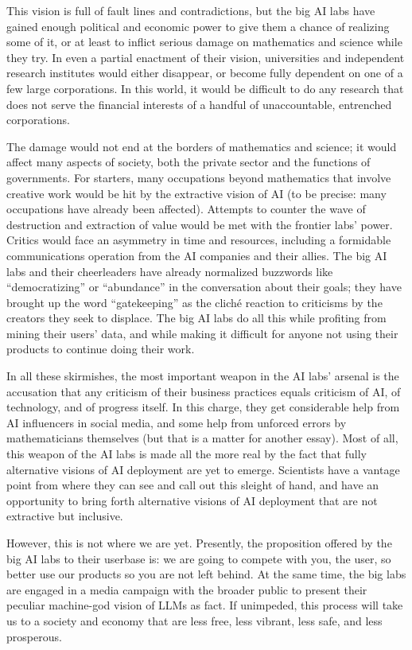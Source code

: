 \documentclass[11pt]{amsart}
\begin{document}
This vision is full of fault lines and contradictions, but the big AI labs have gained enough political and economic power to give them a chance of realizing some of it, or at least to inflict serious damage on mathematics and science while they try. In even a partial enactment of their vision, universities and independent research institutes would either disappear, or become fully dependent on one of a few large corporations. In this world, it would be difficult to do any research that does not serve the financial interests of a handful of unaccountable, entrenched corporations.

The damage would not end at the borders of mathematics and science; it would affect many aspects of society, both the private sector and the functions of governments. For starters, many occupations beyond mathematics that involve creative work would be hit by the extractive vision of AI (to be precise: many occupations have already been affected). Attempts to counter the wave of destruction and extraction of value would be met with the frontier labs' power. Critics would face an asymmetry in time and resources, including a formidable communications operation from the AI companies and their allies. The big AI labs and their cheerleaders have already normalized buzzwords like ``democratizing'' or ``abundance'' in the conversation about their goals; they have brought up the word ``gatekeeping'' as the cliché reaction to criticisms by the creators they seek to displace. The big AI labs do all this while profiting from mining their users' data, and while making it difficult for anyone not using their products to continue doing their work.

In all these skirmishes, the most important weapon in the AI labs' arsenal is the accusation that any criticism of their business practices equals criticism of AI, of technology, and of progress itself. In this charge, they get considerable help from AI influencers in social media, and some help from unforced errors by mathematicians themselves (but that is a matter for another essay). Most of all, this weapon of the AI labs is made all the more real by the fact that fully alternative visions of AI deployment are yet to emerge. Scientists have a vantage point from where they can see and call out this sleight of hand, and have an opportunity to bring forth alternative visions of AI deployment that are not extractive but inclusive.

However, this is not where we are yet. Presently, the proposition offered by the big AI labs to their userbase is: we are going to compete with you, the user, so better use our products so you are not left behind. At the same time, the big labs are engaged in a media campaign with the broader public to present their peculiar machine-god vision of LLMs as fact. If unimpeded, this process will take us to a society and economy that are less free, less vibrant, less safe, and less prosperous.
\end{document}
